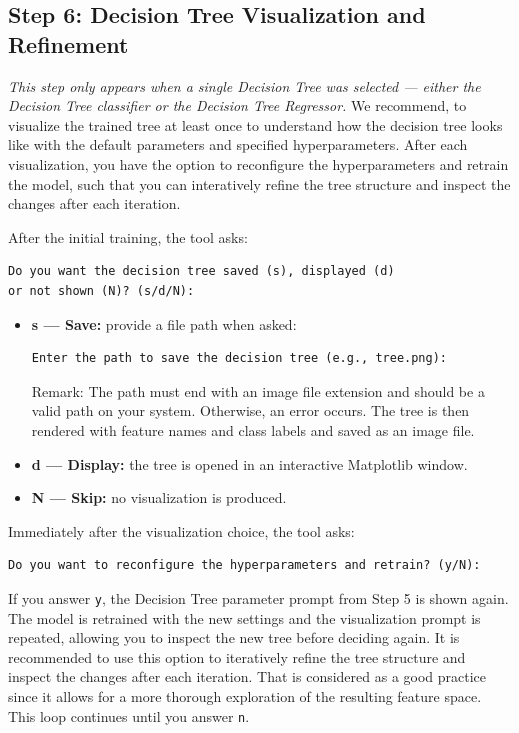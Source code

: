 \documentclass[12pt,a4paper]{article}
\begin{document}
\subsection{Step 6: Decision Tree Visualization and Refinement}
\textit{This step only appears when a single Decision Tree was selected --- either the Decision Tree classifier or the Decision Tree Regressor.} We recommend, to visualize the trained tree at least once to understand how the decision tree looks like with the default parameters and specified hyperparameters. After each visualization, you have the option to reconfigure the hyperparameters and retrain the model, such that you can interatively refine the tree structure and inspect the changes after each iteration.

After the initial training, the tool asks:
\begin{verbatim}
Do you want the decision tree saved (s), displayed (d)
or not shown (N)? (s/d/N):
\end{verbatim}
\begin{itemize}
    \item \textbf{s --- Save:} provide a file path when asked:
    \begin{verbatim}
Enter the path to save the decision tree (e.g., tree.png):
    \end{verbatim}
    Remark: The path must end with an image file extension and should be a valid path on your system. Otherwise, an error occurs.
    The tree is then rendered with feature names and class labels and saved as an image file.
    \item \textbf{d --- Display:} the tree is opened in an interactive Matplotlib window.
    \item \textbf{N --- Skip:} no visualization is produced.
\end{itemize}

Immediately after the visualization choice, the tool asks:
\begin{verbatim}
Do you want to reconfigure the hyperparameters and retrain? (y/N):
\end{verbatim}

If you answer \texttt{y}, the Decision Tree parameter prompt from Step 5 is shown again. The model is retrained with the new settings and the visualization prompt is repeated, allowing you to inspect the new tree before deciding again. It is recommended to use this option to iteratively refine the tree structure and inspect the changes after each iteration. That is considered as a good practice since it allows for a more thorough exploration of the resulting feature space. This loop continues until you answer \texttt{n}.
\end{document}
